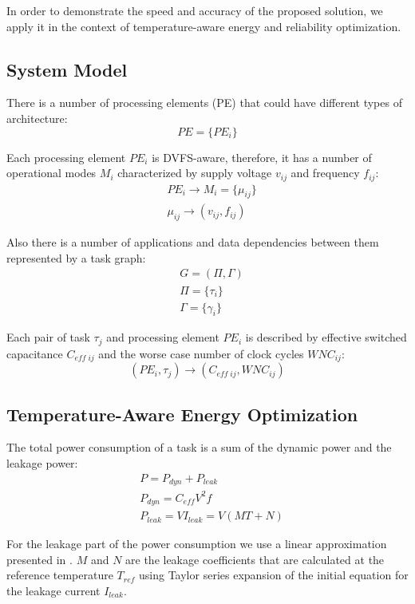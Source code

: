 In order to demonstrate the speed and accuracy of the proposed solution, we apply it in the context of temperature-aware energy and reliability optimization.

\subsection{System Model}
There is a number of processing elements (PE) that could have different types of architecture:
\[
  PE = \{ PE_i \}
\]

Each processing element $PE_i$ is DVFS-aware, therefore, it has a number of operational modes $M_i$ characterized by supply voltage $v_{ij}$ and frequency $f_{ij}$:
\begin{align*}
  & PE_i \rightarrow M_i = \{ \mu_{ij} \} \\
  & \mu_{ij} \rightarrow (v_{ij}, f_{ij})
\end{align*}

Also there is a number of applications and data dependencies between them represented by a task graph:
\begin{align*}
  & G = (\Pi, \Gamma) \\
  & \Pi = \{\tau_i\} \\
  & \Gamma = \{\gamma_i\}
\end{align*}

Each pair of task $\tau_j$ and processing element $PE_i$ is described by effective switched capacitance $C_{eff \; ij}$ and the worse case number of clock cycles $WNC_{ij}$:
\[
  (PE_i, \tau_j) \rightarrow (C_{eff \; ij}, WNC_{ij})
\]

\subsection{Temperature-Aware Energy Optimization}
The total power consumption of a task is a sum of the dynamic power and the leakage power:
\begin{align*}
  & P = P_{dyn} + P_{leak} \\
  & P_{dyn} = C_{eff} V^2 f \\
  & P_{leak} = V I_{leak} = V (MT + N)
\end{align*}

For the leakage part of the power consumption we use a linear approximation presented in \cite{liu2007}. $M$ and $N$ are the leakage coefficients that are calculated at the reference temperature $T_{ref}$ using Taylor series expansion of the initial equation for the leakage current $I_{leak}$.


